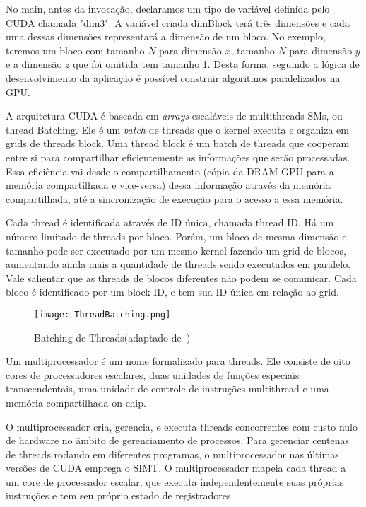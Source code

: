 No main, antes da invocação, declaramos um tipo de variável definida pelo CUDA chamada "dim3". A variável criada dimBlock terá três dimensões e cada uma dessas dimensões representará a dimensão de um bloco. No exemplo, teremos um bloco com tamanho $N$ para dimensão $x$, tamanho $N$ para dimensão $y$ e a dimensão $z$ que foi omitida tem tamanho 1. Desta forma, seguindo a lógica de desenvolvimento da aplicação é possível construir algoritmos paralelizados na GPU.


A arquitetura CUDA é baseada em \textit{arrays} escaláveis de multithreads SMs, ou thread Batching. Ele é um \textit{batch} de threads que o kernel executa e organiza em grids de threads block. Uma thread block é um batch de threads que cooperam entre si para compartilhar eficientemente as informações que serão processadas. Essa eficiência vai desde o compartilhamento (cópia da DRAM GPU para a memória compartilhada e vice-versa) dessa informação através da memória compartilhada, até a sincronização de execução para o acesso a essa memória.

Cada thread é identificada através de ID única, chamada thread ID. Há um número limitado de threads por bloco. Porém, um bloco de mesma dimensão e tamanho pode ser executado por um mesmo kernel fazendo um grid de blocos, aumentando ainda mais a quantidade de threads sendo executados em paralelo. Vale salientar que as threads de blocos diferentes não podem se comunicar.
Cada bloco é identificado por um block ID, e tem sua ID única em relação ao grid.

\begin{figure}[!htb]
	\begin{center}
	\centering
			\texttt{[image: ThreadBatching.png]}
	\label{fig: ThreadBatching}
	\caption{Batching de Threads(adaptado de~\citep{cuda})}
	\end{center}
\end{figure}

Um multiprocessador é um nome formalizado para threads. Ele consiste de oito cores de processadores escalares, duas unidades de funções especiais transcendentais, uma unidade de controle de instruções multithread e uma memória compartilhada on-chip.

O multiprocessador cria, gerencia, e executa threads concorrentes com custo nulo de hardware no âmbito de gerenciamento de processos. Para gerenciar centenas de threads rodando em diferentes programas, o multiprocessador nas últimas versões de CUDA emprega o SIMT. O multiprocessador mapeia cada thread a um core de processador escalar, que executa independentemente suas próprias instruções e tem seu próprio estado de registradores.

